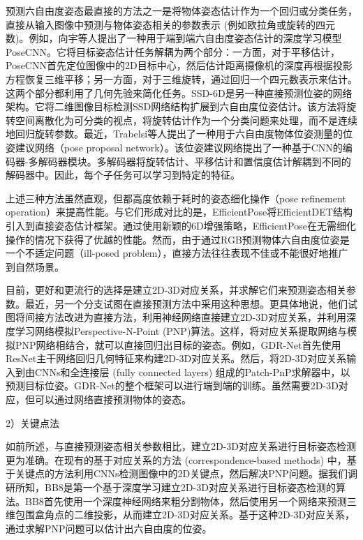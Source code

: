 \documentclass[12pt]{article}
\begin{document}
预测六自由度姿态最直接的方法之一是将物体姿态估计作为一个回归或分类任务，直接从输入图像中预测与物体姿态相关的参数表示 (例如欧拉角或旋转的四元数)。例如，向宇等人\cite{Xiang2018}提出了一种用于端到端六自由度姿态估计的深度学习模型PoseCNN。它将目标姿态估计任务解耦为两个部分：一方面，对于平移估计，PoseCNN首先定位图像中的2D目标中心，然后估计距离摄像机的深度再根据投影方程恢复三维平移；另一方面，对于三维旋转，通过回归一个四元数表示来估计。这两个部分都利用了几何先验来简化任务。SSD-6D\cite{kehl2017ssd}是另一种直接预测位姿的网络架构。它将二维图像目标检测SSD\cite{liu2016ssd}网络结构扩展到六自由度位姿估计。该方法将旋转空间离散化为可分类的视点，将旋转估计作为一个分类问题来处理，而不是连续地回归旋转参数。最近，Trabelsi等人\cite{trabelsi2021pose}提出了一种用于六自由度物体位姿测量的位姿建议网络（pose proposal network）。该位姿建议网络提出了一种基于CNN的编码器-多解码器模块。多解码器将旋转估计、平移估计和置信度估计解耦到不同的解码器中。因此，每个子任务可以学习到特定的特征。

上述三种方法虽然直观，但都高度依赖于耗时的姿态细化操作（pose refinement operation）来提高性能。与它们形成对比的是，EfficientPose\cite{bukschat2020efficientpose}将EfficientDET\cite{tan2020efficientdet}结构引入到直接姿态估计框架。通过使用新颖的6D增强策略，EfficientPose在无需细化操作的情况下获得了优越的性能。然而，由于通过RGB预测物体六自由度位姿是一个不适定问题（ill-posed problem），直接方法往往表现不佳或不能很好地推广到自然场景。

目前，更好和更流行的选择是建立2D-3D对应关系，并求解它们来预测姿态相关参数。最近，另一个分支\cite{hu2020singleStage,chen2020end2end,wang2021gdrnet}试图在直接预测方法中采用这种思想。更具体地说，他们试图将间接方法改进为直接方法，利用神经网络直接建立2D-3D对应关系，并利用深度学习网络模拟Perspective-N-Point (PNP)\cite{lepetit2009epnp}算法。这样，将对应关系提取网络与模拟PNP网络相结合，就可以直接回归出目标的姿态。例如，GDR-Net\cite{wang2021gdrnet}首先使用ResNet\cite{he2016resnet}主干网络回归几何特征来构建2D-3D对应关系。然后，将2D-3D对应关系输入到由CNNs和全连接层 (fully connected layers) 组成的Patch-PnP求解器中，以预测目标位姿。GDR-Net的整个框架可以进行端到端的训练。虽然需要2D-3D对应，但可以通过网络直接预测物体的姿态。

2）关键点法

如前所述，与直接预测姿态相关参数相比，建立2D-3D对应关系进行目标姿态检测更为准确。在现有的基于对应关系的方法 (correspondence-based methods) 中，基于关键点的方法利用CNNs检测图像中的2D关键点，然后解决PNP问题\cite{lepetit2009epnp}。据我们调研所知，BB8\cite{rad2017bb8}是第一个基于深度学习建立2D-3D对应关系进行目标姿态检测的算法。BB8首先使用一个深度神经网络来粗分割物体，然后使用另一个网络来预测三维包围盒角点的二维投影，从而建立2D-3D对应关系。基于这种2D-3D对应关系，通过求解PNP问题可以估计出六自由度的位姿。
\end{document}
